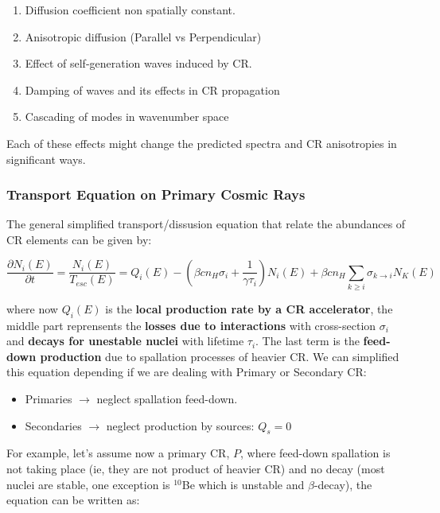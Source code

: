 \documentclass[
  letterpaper,
  DIV=11,
  numbers=noendperiod]{scrreprt}
\providecommand{\tightlist}{%
  \setlength{\itemsep}{0pt}\setlength{\parskip}{0pt}}\usepackage{longtable,booktabs,array}
\begin{document}
\begin{enumerate}
\def\labelenumi{\arabic{enumi}.}
\tightlist
\item
  Diffusion coefficient non spatially constant.
\item
  Anisotropic diffusion (Parallel vs Perpendicular)
\item
  Effect of self-generation waves induced by CR.
\item
  Damping of waves and its effects in CR propagation
\item
  Cascading of modes in wavenumber space
\end{enumerate}

Each of these effects might change the predicted spectra and CR
anisotropies in significant ways.

\subsubsection{Transport Equation on Primary Cosmic
Rays}\label{transport-equation-on-primary-cosmic-rays}

The general simplified transport/dissusion equation that relate the
abundances of CR elements can be given by:

\[\frac{\partial N_i(E)}{\partial t} =\frac{N_i(E)}{T_{esc}(E)} = Q_i(E) - \left(\beta c n_H \sigma_i + \frac{1}{\gamma\tau_i}\right)N_i(E) + \beta c n_H \sum_{k\ge i}\sigma_{k\rightarrow i}N_K(E)\]

where now \(Q_i(E)\) is the \textbf{local production rate by a CR
accelerator}, the middle part reprensents the \textbf{losses due to
interactions} with cross-section \(\sigma_i\) and \textbf{decays for
unestable nuclei} with lifetime \(\tau_i\). The last term is the
\textbf{feed-down production} due to spallation processes of heavier CR.
We can simplified this equation depending if we are dealing with Primary
or Secondary CR:

\begin{itemize}
\tightlist
\item
  Primaries \(\rightarrow\) neglect spallation feed-down.
\item
  Secondaries \(\rightarrow\) neglect production by sources: \(Q_s = 0\)
\end{itemize}

For example, let's assume now a primary CR, \(P\), where feed-down
spallation is not taking place (ie, they are not product of heavier CR)
and no decay (most nuclei are stable, one exception is \(^{10}\)Be which
is unstable and \(\beta\)-decay), the equation can be written as:
\end{document}
